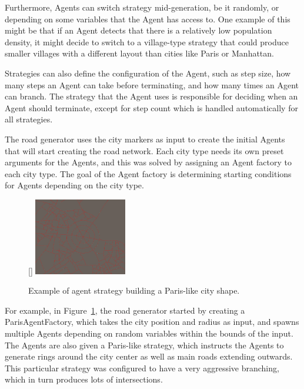 Furthermore, Agents can switch strategy mid-generation, be it randomly, or depending on some variables that the Agent has access to.
One example of this might be that if an Agent detects that there is a relatively low population density, it might decide to switch to a village-type strategy that could produce smaller villages with a different layout than cities like Paris or Manhattan.

Strategies can also define the configuration of the Agent, such as step size, how many steps an Agent can take before terminating, and how many times an Agent can branch.
The strategy that the Agent uses is responsible for deciding when an Agent should terminate, except for step count which is handled automatically for all strategies.

The road generator uses the city markers as input to create the initial Agents that will start creating the road network.
Each city type needs its own preset arguments for the Agents, and this was solved by assigning an Agent factory to each city type.
The goal of the Agent factory is determining starting conditions for Agents depending on the city type.

\begin{figure}
  \centering
  \raisebox{0pt}[\dimexpr{}\baselineskip\relax]{
    \includegraphics[width=0.36\textwidth]{figure/road_network_paris.png}
  }
  \caption{Example of agent strategy building a Paris-like city shape.}

  \label{fig:road_network_paris}
\end{figure}

For example, in Figure~\ref{fig:road_network_paris}, the road generator started by creating a ParisAgentFactory, which takes the city position and radius as input, and spawns multiple Agents depending on random variables within the bounds of the input.
The Agents are also given a Paris-like strategy, which instructs the Agents to generate rings around the city center as well as main roads extending outwards.
This particular strategy was configured to have a very aggressive branching, which in turn produces lots of intersections.


